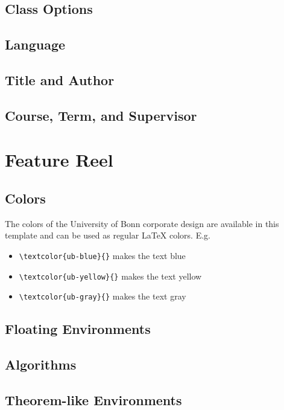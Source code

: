 \documentclass[logo]{mlai-report}
\begin{document}
	\subsection{Class Options} 
	
	\subsection{Language} 
	
	\subsection{Title and Author}
	
	\subsection{Course, Term, and Supervisor} 
	
	\section{Feature Reel} 

	\subsection{Colors}
	The colors of the University of Bonn corporate design are available in this template and can be used as regular \LaTeX{} colors. E.g.
	\begin{itemize}
	\item \verb+\textcolor{ub-blue}{}+ \textcolor{ub-blue}{makes the text blue}
	\item \verb+\textcolor{ub-yellow}{}+ \textcolor{ub-yellow}{makes the text yellow}
	\item \verb+\textcolor{ub-gray}{}+ \textcolor{ub-gray}{makes the text gray}
	\end{itemize}
	
	\subsection{Floating Environments} 
	
	\subsection{Algorithms}
	
	\subsection{Theorem-like Environments} 
	
\end{document}
